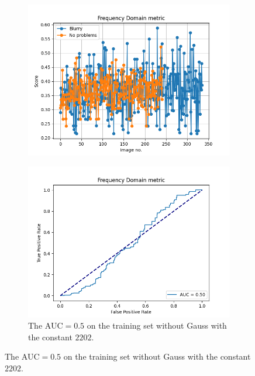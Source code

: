 \begin{figure}[H]
    \begin{subfigure}[t]{0.48\textwidth}
        \includegraphics[width=\textwidth]{Figures/BlurredImages/tweakFM/2202_output_basic.png}
        \caption{}
        \label{fig:FM_basic_2202}
    \end{subfigure}\hspace{1em}
    \begin{subfigure}[t]{0.48\textwidth}
        \includegraphics[width=\textwidth]{Figures/BlurredImages/tweakFM/2202_output_roc.png}
        \caption{The AUC$=0.5$ on the training set without Gauss with the constant $2202$.}
        \label{fig:FM_roc_2202}
    \end{subfigure}\hspace{1em}

\end{figure}
